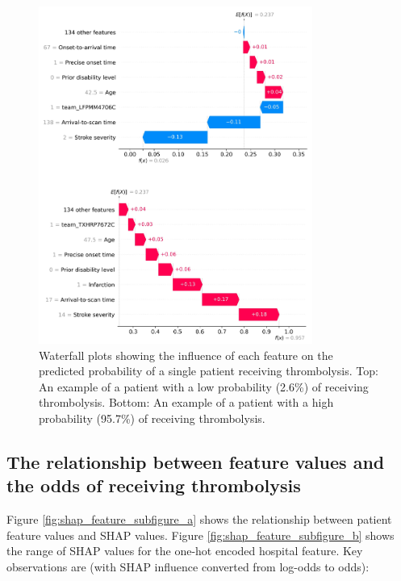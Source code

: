 \begin{figure}[!h]
\centering
\includegraphics[width=0.8\textwidth]{./images/waterfall}
\caption{Waterfall plots showing the influence of each feature on the predicted probability of a single patient receiving thrombolysis. Top: An example of a patient with a low probability (2.6\%) of receiving thrombolysis. Bottom: An example of a patient with a high probability (95.7\%) of receiving thrombolysis.}
\label{fig:results_waterfall}
\end{figure}



\subsection{The relationship between feature values and the odds of receiving thrombolysis}

Figure \ref{fig:shap_feature_subfigure_a} shows the relationship between patient feature values and SHAP values. Figure \ref{fig:shap_feature_subfigure_b} shows the range of SHAP values for the one-hot encoded hospital feature. Key observations are (with SHAP influence converted from log-odds to odds):

